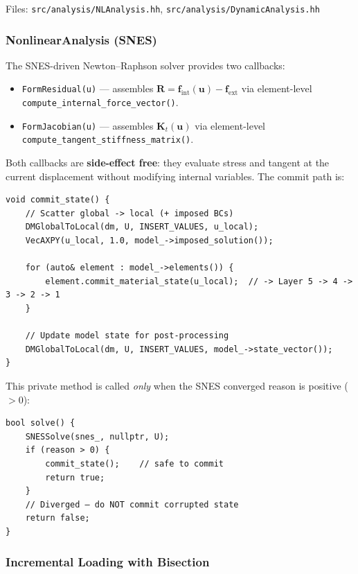 Files:
\texttt{src/analysis/NLAnalysis.hh},
\texttt{src/analysis/DynamicAnalysis.hh}

\subsubsection{NonlinearAnalysis (SNES)}

The SNES-driven Newton--Raphson solver provides two callbacks:
\begin{itemize}
  \item \texttt{FormResidual(u)} ---
        assembles $\mathbf{R} = \mathbf{f}_{\mathrm{int}}(\mathbf{u}) -
        \mathbf{f}_{\mathrm{ext}}$
        via element-level \texttt{compute\_internal\_force\_vector()}.
  \item \texttt{FormJacobian(u)} ---
        assembles $\mathbf{K}_t(\mathbf{u})$
        via element-level \texttt{compute\_tangent\_stiffness\_matrix()}.
\end{itemize}

Both callbacks are \textbf{side-effect free}: they evaluate stress
and tangent at the current displacement without modifying internal
variables.  The commit path is:

\begin{verbatim}
void commit_state() {
    // Scatter global -> local (+ imposed BCs)
    DMGlobalToLocal(dm, U, INSERT_VALUES, u_local);
    VecAXPY(u_local, 1.0, model_->imposed_solution());

    for (auto& element : model_->elements()) {
        element.commit_material_state(u_local);  // -> Layer 5 -> 4 -> 3 -> 2 -> 1
    }

    // Update model state for post-processing
    DMGlobalToLocal(dm, U, INSERT_VALUES, model_->state_vector());
}
\end{verbatim}

This private method is called \emph{only} when the SNES converged
reason is positive ($> 0$):

\begin{verbatim}
bool solve() {
    SNESSolve(snes_, nullptr, U);
    if (reason > 0) {
        commit_state();    // safe to commit
        return true;
    }
    // Diverged — do NOT commit corrupted state
    return false;
}
\end{verbatim}

\subsubsection{Incremental Loading with Bisection}

